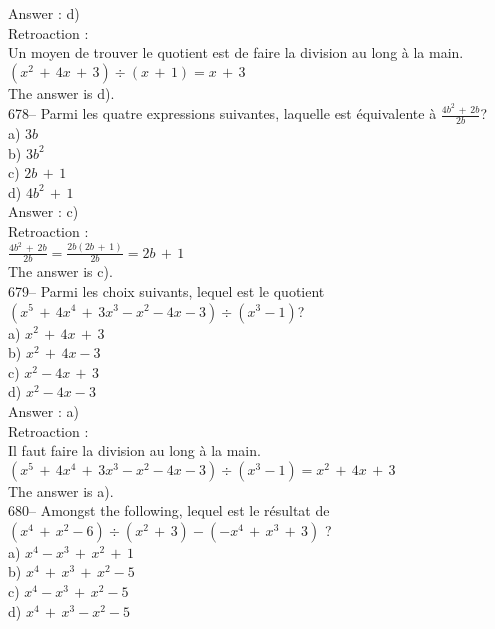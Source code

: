 ﻿\documentclass[letterpaper, 12pt]{article}
\begin{document}
Answer : d)\\

Retroaction : \\
Un moyen de trouver le quotient est de faire la division au long \`a la
main.\\
$\left( x^{2}\,+\,4x\,+\,3\right) \div \left( x\,+\,1\right)= x\,+\,3$\\
The answer is d).\\

678-- Parmi les quatre expressions suivantes, laquelle est \'equivalente \`a
$\frac{4b^{2}\,+\,2b}{2b}$?\\
a) $3b$\\
b) $3b^{2}$\\
c) $2b\,+\,1$\\
d) $4b^{2}\,+\,1$\\

Answer : c)\\

Retroaction : \\[2mm]
$\frac{4b^{2}\,+\,2b}{2b}=\frac{2b\left(2b\,+\,1 \right)
}{2b}=2b\,+\,1$\\[2mm]
The answer is c).\\

679-- Parmi les choix suivants, lequel est le quotient $\left(
x^{5}\,+\,4x^{4}\,+\,3x^{3}-x^{2}-4x-3\right) \div\left( x^{3}-1\right) $?\\
a) $x^{2}\,+\,4x\,+\,3$\\
b) $x^{2}\,+\,4x-3$\\
c) $x^{2}-4x\,+\,3$\\
d) $x^{2}-4x-3$\\

Answer : a)\\

Retroaction :\\
Il faut faire la division au long \`a la main.  \\
$\left( x^{5}\,+\,4x^{4}\,+\,3x^{3}-x^{2}-4x-3\right) \div\left(
x^{3}-1\right)=x^{2}\,+\,4x\,+\,3$\\
The answer is a).\\

680-- Amongst the following, lequel est le r\'esultat de $\left(
x^{4}\,+\,x^{2}-6\right) \div\left( x^{2}\,+\,3\right) -\left(
-x^{4}\,+\,x^{3}\,+\,3\right)$ ?\\
a) $x^{4}-x^{3}\,+\,x^{2}\,+\,1$\\
b) $x^{4}\,+\,x^{3}\,+\,x^{2}-5$\\
c) $x^{4}-x^{3}\,+\,x^{2}-5$\\
d) $x^{4}\,+\,x^{3}-x^{2}-5$\\
\end{document}
